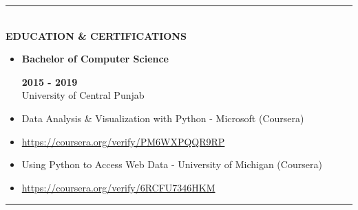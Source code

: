 \documentclass[10pt,a4paper]{article}
\newcommand{\MyHorizontalLine}{\noindent\rule{\linewidth}{1.5pt}\\}
\begin{document}
	\MyHorizontalLine
	\textbf{EDUCATION \& CERTIFICATIONS}
	\begin{itemize}
		\item\textbf{Bachelor of Computer Science}\hfill\raggedright\textbf{2015 - 2019}\\
		University of Central Punjab
		\item Data Analysis \& Visualization with Python - Microsoft (Coursera)
		\item[] \url{https://coursera.org/verify/PM6WXPQQR9RP}
		\item Using Python to Access Web Data - University of Michigan (Coursera)
		\item[] \url{https://coursera.org/verify/6RCFU7346HKM}
	\end{itemize}
	\MyHorizontalLine
\end{document}
